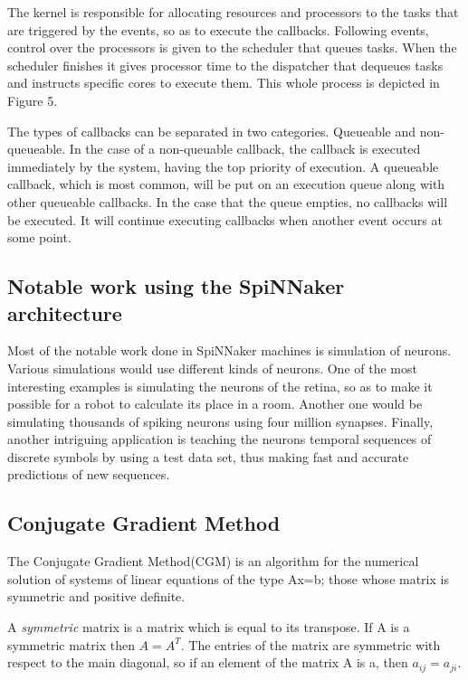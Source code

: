 \documentclass[12pt,a4paper]{article}
\begin{document}
The kernel is responsible for allocating resources and processors to the tasks that are triggered by the events, so as to execute the callbacks. Following events, control over the processors is given to the scheduler that queues tasks. When the scheduler finishes it gives processor time to the dispatcher that dequeues tasks and instructs specific cores to execute them. This whole process is depicted in Figure 5.

The types of callbacks can be separated in two categories. Queueable and non-queueable. In the case of a non-queuable callback, the callback is executed immediately by the system, having the top priority of execution. A queueable callback, which is most common, will be put on an execution queue along with other queueable callbacks. In the case that the queue empties, no callbacks will be executed. It will continue executing callbacks when another event occurs at some point\cite{sharp2011event}\cite{rast2012managing}. 
	
\subsection{Notable work using the SpiNNaker architecture}
Most of the notable work done in SpiNNaker machines is simulation of neurons. Various simulations would use different kinds of neurons\cite{rast2012event}\cite{rast2011event}\cite{davies2011maintaining}\cite{jin2010algorithm}. One of the most interesting examples is simulating the neurons of the retina, so as to make it possible for a robot to calculate its place in a room\cite{davies2010interfacing}. Another one would be simulating thousands of spiking neurons using four million synapses\cite{sharp2012power}. Finally, another intriguing application is teaching the neurons temporal sequences  of discrete symbols by using a test data set, thus making fast and accurate predictions of new sequences\cite{bose2005spiking}.

\subsection{Conjugate Gradient Method}
The Conjugate Gradient Method(CGM) is an algorithm for the numerical solution of systems of linear equations of the type Ax=b; those whose matrix is symmetric and positive definite. 

A \emph{symmetric} matrix is a matrix which is equal to its transpose. If A is a symmetric matrix then $A=A^T$. The entries of the matrix are symmetric with respect to the main diagonal, so if an element of the matrix A is a, then $a_{ij}=a_{ji}$. 
\end{document}

